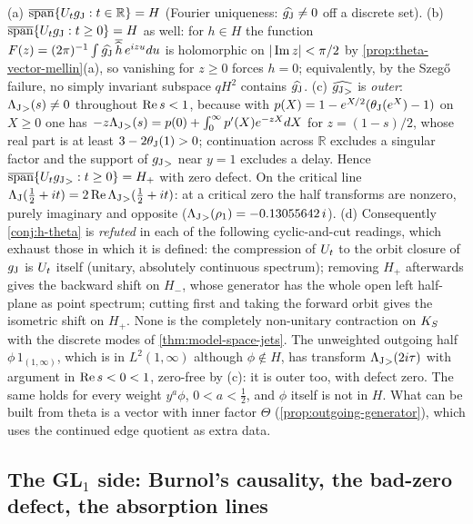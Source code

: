 \begin{theorem}
\label{thm:theta-vector-cyclic}
(a) $\overline{\mathrm{span}}\{U_tg_{\mathrm J}:t\in\mathbb R\} = H$ (Fourier uniqueness: $\widehat{g_{\mathrm J}}\ne0$ off a discrete
set). (b) $\overline{\mathrm{span}}\{U_tg_{\mathrm J}:t\ge0\} = H$ as well: for $h\in H$ the function $F(z) = (2\pi)^{-1}
\int\widehat{g_{\mathrm J}}\,\overline{\widehat h}\,e^{izu}du$ is holomorphic on $|\operatorname{Im} z|<\pi/2$ by \cref{prop:theta-vector-mellin}(a),
so vanishing for $z\ge0$ forces $h = 0$; equivalently, by the Szeg\H o failure, no simply invariant subspace $qH^2$
contains $\widehat{g_{\mathrm J}}$. (c) $\widehat{{g_{\mathrm J}}_{>}}$ is \emph{outer}: ${\Lambda_{\mathrm J}}_{>}(s)\ne0$ throughout $\operatorname{Re} s<1$, because with
$p(X) = 1 - e^{X/2}(\theta_{\mathrm J}(e^X)-1)$ on $X\ge0$ one has $-z{\Lambda_{\mathrm J}}_{>}(s) = p(0) + \int_0^\infty p'(X)e^{-zX}dX$ for
$z = (1-s)/2$, whose real part is at least $3 - 2\theta_{\mathrm J}(1)>0$; continuation across $\mathbb R$ excludes a singular
factor and the support of ${g_{\mathrm J}}_{>}$ near $y = 1$ excludes a delay. Hence $\overline{\mathrm{span}}\{U_t{g_{\mathrm J}}_{>}:t\ge0\}
= H_+$ with zero defect. On the critical line $\Lambda_{\mathrm J}(\tfrac12+it) = 2\operatorname{Re}{\Lambda_{\mathrm J}}_{>}(\tfrac12+it)$: at a critical zero
the half transforms are nonzero, purely imaginary and opposite (${\Lambda_{\mathrm J}}_{>}(\rho_1) = -0.13055642\,i$). (d)
Consequently \cref{conj:h-theta} is \emph{refuted} in each of the following cyclic-and-cut readings, which exhaust those in which it is defined: the compression of $U_t$ to the
orbit closure of $g_{\mathrm J}$ is $U_t$ itself (unitary, absolutely continuous spectrum); removing $H_+$ afterwards gives
the backward shift on $H_-$, whose generator has the whole open left half-plane as point spectrum; cutting first
and taking the forward orbit gives the isometric shift on $H_+$. None is the completely non-unitary contraction on
$K_S$ with the discrete modes of \cref{thm:model-space-jets}. The unweighted outgoing half $\phi\,1_{(1,\infty)}$, which is in $L^2(1,\infty)$ although $\phi\notin H$, has transform ${\Lambda_{\mathrm J}}_{>}(2i\tau)$ with argument in $\operatorname{Re} s<0<1$, zero-free by (c): it is outer too, with defect zero. The same holds for every weight $y^a\phi$,
$0<a<\tfrac12$, and $\phi$ itself is not in $H$. What can be built from theta is a vector with inner factor
$\Theta$ (\cref{prop:outgoing-generator}), which uses the continued edge quotient as extra data.
\end{theorem}

\subsection{The GL$_1$ side: Burnol's causality, the bad-zero defect, the absorption lines}

